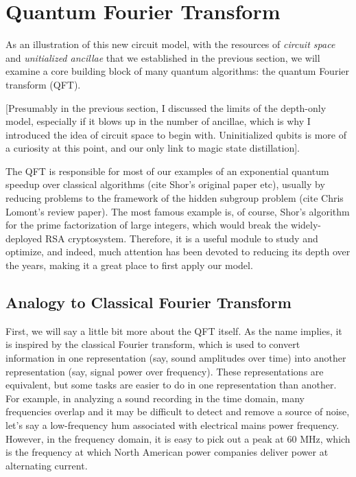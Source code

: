 \section{Quantum Fourier Transform}
\label{sec:qft}

As an illustration of this new circuit model, with the resources of
\emph{circuit space} and \emph{unitialized ancillae} that we established in
the previous section, we will examine a core building block of many
quantum algorithms: the quantum Fourier transform (QFT).

[Presumably in the previous section, I discussed the limits of the depth-only
model, especially if it blows up in the number of ancillae, which is why I
introduced the idea of circuit space to begin with. Uninitialized qubits is
more of a curiosity at this point, and our only link to magic state distillation].

The QFT is responsible for most of our examples of an exponential quantum
speedup over classical algorithms (cite Shor's original paper etc), usually
by reducing problems to the framework of the hidden subgroup problem
(cite Chris Lomont's review paper). The most famous example is, of course,
Shor's algorithm for the prime factorization of large integers, which would
break the widely-deployed RSA cryptosystem. Therefore, it is a useful
module to study and optimize, and indeed, much attention has been devoted
to reducing its depth over the years, making it a great place to first apply
our model.

\subsection{Analogy to Classical Fourier Transform}

First, we will say a little bit more about the QFT itself. As the name implies,
it is inspired by the classical Fourier transform, which is used to convert
information in one representation (say, sound amplitudes over time) into another
representation (say, signal power over frequency). These representations are
equivalent, but some tasks are easier to do in one representation than another.
For example, in analyzing a sound recording in the time domain, many frequencies overlap and it
may be difficult to detect and remove a source of noise, let's say a low-frequency
hum associated with electrical mains power frequency. However, in the frequency
domain, it is easy to pick out a peak at 60 MHz, which is the frequency at
which North American power companies deliver power at alternating current.

